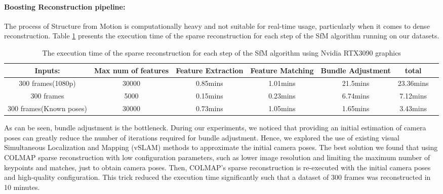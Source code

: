 \documentclass[11pt]{article}
\begin{document}
    \paragraph{Boosting Reconstruction pipeline:}
    The process of Structure from Motion is computationally heavy and not suitable for real-time usage,
    particularly when it comes to dense reconstruction. Table \ref{tab:exe_time} presents the execution time of the sparse reconstruction
    for each step of the SfM algorithm running on our datasets.
    \begin{table}[htb]
        \centering
        \begin{adjustbox}{max width=\textwidth}
            \begin{tabular}{|c|c|c|c|c|c|c|}
                \hline
                 Inputs:                 & Max num of features & Feature Extraction & Feature Matching & Bundle Adjustment & total    \\
                \hline
                300 frames(1080p)       & 30000               & 0.85mins           & 1.01mins          & 21.5mins          & 23.36mins \\
                \hline
                300 frames              & 5000                & 0.15mins           & 0.23mins          & 6.74mins          & 7.12mins \\
                \hline
                300 frames(Known poses) & 30000               & 0.73mins           & 1.05mins          & 1.65mins          & 3.43mins \\
                \hline
            \end{tabular}
        \end{adjustbox}
        \caption{The execution time of the sparse reconstruction for each step of the SfM algorithm using Nvidia RTX3090 graphics}
        \label{tab:exe_time}
    \end{table}

    As can be seen, bundle adjustment is the bottleneck. During our experiments, we noticed that providing an
    initial estimation of camera poses can greatly reduce the number of iterations required for bundle adjustment.
    Hence, we explored the use of existing visual Simultaneous Localization and Mapping (vSLAM) methods to approximate
    the initial camera poses. The best solution we found that using COLMAP sparse reconstruction with low configuration
    parameters, such as lower image resolution and limiting the maximum number of keypoints and matches, just to obtain
    camera poses. Then, COLMAP's sparse reconstruction is re-executed with the initial camera poses and high-quality configuration.
    This trick reduced the execution time significantly such that a dataset of 300 frames was reconstructed in 10 minutes.
\end{document}
